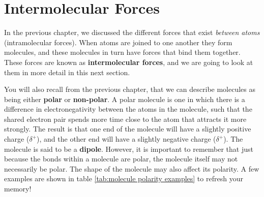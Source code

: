 \chapter{Intermolecular Forces}
\label{chap:intermolecular}
In the previous chapter, we discussed the different forces that exist \textit{between atoms} (intramolecular forces). When atoms are joined to one another they form molecules, and these molecules in turn have forces that bind them together. These forces are known as \textbf{intermolecular forces}, and we are going to look at them in more detail in this next section.\\

You will also recall from the previous chapter, that we can describe molecules as being either \textbf{polar} or \textbf{non-polar}. A polar molecule is one in which there is a difference in electronegativity between the atoms in the molecule, such that the shared electron pair spends more time close to the atom that attracts it more strongly. The result is that one end of the molecule will have a slightly positive charge ($\delta^{+}$), and the other end will have a slightly negative charge ($\delta^{+}$). The molecule is said to be a \textbf{dipole}. However, it is important to remember that just because the bonds within a molecule are polar, the molecule itself may not necessarily be polar. The shape of the molecule may also affect its polarity. A few examples are shown in table \ref{tab:molecule polarity examples} to refresh your memory!

